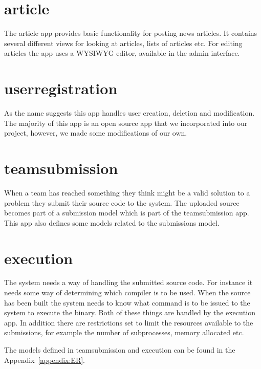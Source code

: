 \section{article}
The article app provides basic functionality for posting news articles.
It contains several different views for looking at articles, lists of
articles etc. For editing articles the app uses a WYSIWYG editor,
available in the admin interface. 

\section{userregistration}
As the name suggests this app handles user creation, deletion and
modification. The majority of this app is an open source app that we
incorporated into our project, however, we made some
modifications of our own. 

\section{teamsubmission}
When a team has reached something they think might be a valid solution
to a problem they submit their source code to the system. The uploaded
source becomes part of a submission model which is part of the
teamsubmission app. This app also defines some models related to the submissions model.

\section{execution}
The system needs a way of handling the submitted source code. For
instance it needs some way of determining which compiler is to be used.
When the source has been built the system needs to know what command is
to be issued to the system to execute the binary. Both of these things
are handled by the execution app. In addition there are restrictions
set to limit the resources available to the submissions, for example
the number of subprocesses, memory allocated etc.


The models defined in teamsubmission and execution can be found in the
Appendix~\ref{appendix:ER}.


